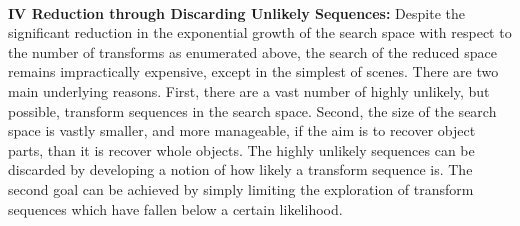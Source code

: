 


 
\noindent\\{\bf IV Reduction through Discarding Unlikely Sequences: } Despite the significant reduction in the exponential growth of the search space with respect to the number of transforms as enumerated above, the search of the reduced space remains impractically expensive, except in the simplest of scenes.  There are two main underlying reasons. First, there are a vast number of highly unlikely, but possible, transform sequences in the search space. Second, the size of the search space is vastly smaller, and more manageable, if the aim is to recover object parts, than it is recover whole objects. The highly unlikely sequences can be discarded by developing a notion of how likely a transform sequence is. The second goal can be achieved by simply limiting the exploration of transform sequences which have fallen below a certain likelihood. 


